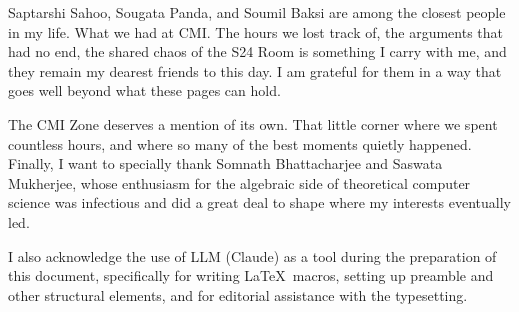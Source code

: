 Saptarshi Sahoo, Sougata Panda, and Soumil Baksi are among the closest people in my life. What we had at CMI. The hours we lost track of, the arguments that had no end, the shared chaos of the S24 Room is something I carry with me, and they remain my dearest friends to this day. I am grateful for them in a way that goes well beyond what these pages can hold.

The CMI Zone deserves a mention of its own. That little corner where we spent countless hours, and where so many of the best moments quietly happened. Finally, I want to specially thank Somnath Bhattacharjee and Saswata Mukherjee, whose enthusiasm for the algebraic side of theoretical computer science was infectious and did a great deal to shape where my interests eventually led.

I also acknowledge the use of LLM (Claude) as a tool during the preparation of this document, specifically for writing \LaTeX\ macros, setting up preamble and other structural elements, and for editorial assistance with the typesetting.
